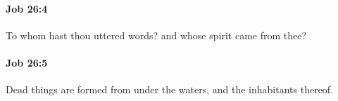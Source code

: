 		\paragraph{Job 26:4} %
			\label{JOB-26-4}

			To whom hast thou uttered words? and whose spirit came from thee?


		\paragraph{Job 26:5} %
			\label{JOB-26-5}

			Dead things are formed from under the waters, and the inhabitants thereof.


